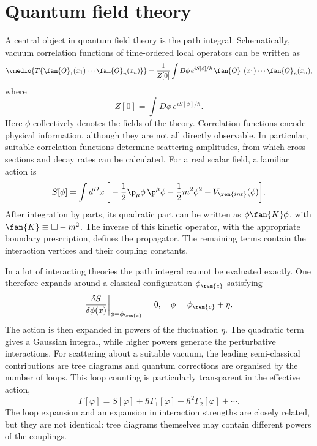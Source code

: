 \section{Quantum field theory}
A central object in quantum field theory is the path integral. Schematically, vacuum correlation functions of time-ordered local operators can be written as
\begin{equation}
    \vmedio{T\{\fan{O}_1(x_1)\cdots\fan{O}_n(x_n)\}} = \frac{1}{Z[0]}\int D\phi\,e^{iS[\phi]/\hbar}\,\fan{O}_1(x_1)\cdots\fan{O}_n(x_n),
\end{equation}
where
\begin{equation}
    Z[0] = \int D\phi\,e^{iS[\phi]/\hbar}.
\end{equation}
Here $\phi$ collectively denotes the fields of the theory. Correlation functions encode physical information, although they are not all directly observable. In particular, suitable correlation functions determine scattering amplitudes, from which cross sections and decay rates can be calculated. For a real scalar field, a familiar action is
\begin{equation}
    S[\phi] = \int d^D x\,
    \bigg[-\frac{1}{2}\p_\mu\phi\,\p^\mu\phi
    -\frac{1}{2}m^2\phi^2-V_{\rem{int}}(\phi)\bigg].
\end{equation}
After integration by parts, its quadratic part can be written as $\phi\fan{K}\phi$, with $\fan{K} \equiv \square - m^2$. The inverse of this kinetic operator, with the appropriate boundary prescription, defines the propagator. The remaining terms contain the interaction vertices and their coupling constants.

In a lot of interacting theories the path integral cannot be evaluated exactly. One therefore expands around a classical configuration $\phi_{\rem{c}}$ satisfying
\begin{equation}
    \frac{\delta S}{\delta\phi(x)}\bigg|_{\phi = \phi_{\rem{c}}} = 0,
    \quad \phi = \phi_{\rem{c}} + \eta.
\end{equation}
The action is then expanded in powers of the fluctuation $\eta$. The quadratic term gives a Gaussian integral, while higher powers generate the perturbative interactions. For scattering about a suitable vacuum, the leading semi-classical contributions are tree diagrams and quantum corrections are organised by the number of loops. This loop counting is particularly transparent in the effective action,
\begin{equation}
    \Gamma[\varphi] = S[\varphi] + \hbar\Gamma_1[\varphi] + \hbar^2\Gamma_2[\varphi] + \cdots.
\end{equation}
The loop expansion and an expansion in interaction strengths are closely related, but they are not identical: tree diagrams themselves may contain different powers of the couplings.

